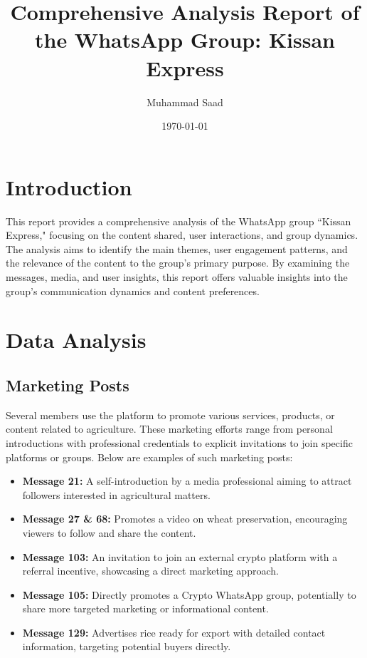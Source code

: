 \documentclass[12pt]{article}
\title{Comprehensive Analysis Report of the WhatsApp Group: Kissan Express}
\author{Muhammad Saad}
\date{\today}
\begin{document}
\maketitle

\section{Introduction}
This report provides a comprehensive analysis of the WhatsApp group ``Kissan Express," focusing on the content shared, user interactions, and group dynamics. The analysis aims to identify the main themes, user engagement patterns, and the relevance of the content to the group's primary purpose. By examining the messages, media, and user insights, this report offers valuable insights into the group's communication dynamics and content preferences.

\section{Data Analysis}
\subsection{Marketing Posts}
Several members use the platform to promote various services, products, or content related to agriculture. These marketing efforts range from personal introductions with professional credentials to explicit invitations to join specific platforms or groups. Below are examples of such marketing posts:

\begin{itemize}
  \item \textbf{Message 21:} A self-introduction by a media professional aiming to attract followers interested in agricultural matters.
  \item \textbf{Message 27 \& 68:} Promotes a video on wheat preservation, encouraging viewers to follow and share the content.
  \item \textbf{Message 103:} An invitation to join an external crypto platform with a referral incentive, showcasing a direct marketing approach.
  \item \textbf{Message 105:} Directly promotes a Crypto WhatsApp group, potentially to share more targeted marketing or informational content.
  \item \textbf{Message 129:} Advertises rice ready for export with detailed contact information, targeting potential buyers directly.
\end{itemize}
\end{document}
